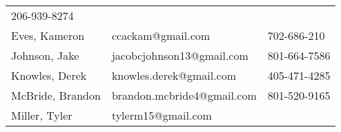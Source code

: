 \begin{longtable}[]{@{}lll@{}}
\begin{minipage}[t]{0.30\columnwidth}
{206-939-8274}\strut
\end{minipage}\tabularnewline
\begin{minipage}[t]{0.30\columnwidth}\raggedright\strut
{Eves, Kameron}\strut
\end{minipage} & \begin{minipage}[t]{0.30\columnwidth}\raggedright\strut
{ccackam@gmail.com}\strut
\end{minipage} & \begin{minipage}[t]{0.30\columnwidth}\raggedright\strut
{702-686-210}\strut
\end{minipage}\tabularnewline
\begin{minipage}[t]{0.30\columnwidth}\raggedright\strut
{Johnson, Jake}\strut
\end{minipage} & \begin{minipage}[t]{0.30\columnwidth}\raggedright\strut
{jacobcjohnson13@gmail.com}\strut
\end{minipage} & \begin{minipage}[t]{0.30\columnwidth}\raggedright\strut
{801-664-7586}\strut
\end{minipage}\tabularnewline
\begin{minipage}[t]{0.30\columnwidth}\raggedright\strut
{Knowles, Derek}\strut
\end{minipage} & \begin{minipage}[t]{0.30\columnwidth}\raggedright\strut
{knowles.derek@gmail.com}\strut
\end{minipage} & \begin{minipage}[t]{0.30\columnwidth}\raggedright\strut
{405-471-4285}\strut
\end{minipage}\tabularnewline
\begin{minipage}[t]{0.30\columnwidth}\raggedright\strut
{McBride, Brandon}\strut
\end{minipage} & \begin{minipage}[t]{0.30\columnwidth}\raggedright\strut
{brandon.mcbride4@gmail.com}\strut
\end{minipage} & \begin{minipage}[t]{0.30\columnwidth}\raggedright\strut
{801-520-9165}\strut
\end{minipage}\tabularnewline
\begin{minipage}[t]{0.30\columnwidth}\raggedright\strut
{Miller, Tyler}\strut
\end{minipage} & \begin{minipage}[t]{0.30\columnwidth}\raggedright\strut
{tylerm15@gmail.com}\strut
\end{minipage} & \begin{minipage}[t]{0.30\columnwidth}\raggedright\strut

\end{minipage}
\end{longtable}

